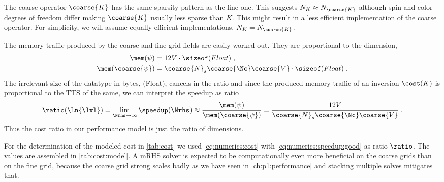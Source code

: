 The coarse operator $\coarse{K}$ has the same sparsity pattern as the fine one.
This suggests $N_{K} \approx N_{\coarse{K}}$ although spin and color degrees of freedom differ making $\coarse{K}$ usually less sparse than $K$.
This might result in a less efficient implementation of the coarse operator.
For simplicity, we will assume equally-efficient implementations, $N_{K} = N_{\coarse{K}}$.

The memory traffic produced by the coarse and fine-grid fields are easily worked out.
They are proportional to the dimension,
\begin{align}
\mem(\psi) &= 12 V \cdot \sizeof(Float) \;, \\
\mem(\coarse{\psi}) &= \coarse{N}_s \coarse{\Nc} \coarse{V} \cdot \sizeof(Float) \;.
\end{align}
The irrelevant size of the datatype in bytes, \sizeof(Float), cancels in the ratio and since the produced memory traffic of an inversion $\cost(K)$ is proportional to the TTS of the same, we can interpret the speedup as ratio
\begin{equation} \label{eq:numerics:speedup:good}
\ratio(\Ln{\lvl})
= \lim_{\Nrhs \to \infty} \speedup(\Nrhs)
\approx \frac{ \mem(\psi) }{ \mem(\coarse{\psi}) }
= \frac{12 V}{ \coarse{N}_s \coarse{\Nc} \coarse{V} } \;.
\end{equation}
Thus the cost ratio in our performance model is just the ratio of dimensions.

For the determination of the modeled cost in \cref{tab:cost} we used \cref{eq:numerics:cost} with \cref{eq:numerics:speedup:good} as ratio $\ratio$.
The values are assembled in \cref{tab:cost:model}.
A mRHS solver is expected to be computationally even more beneficial on the coarse grids than on the fine grid, because the coarse grid strong scales badly as we have seen in \cref{ch:p1:performance} and stacking multiple solves mitigates that.


